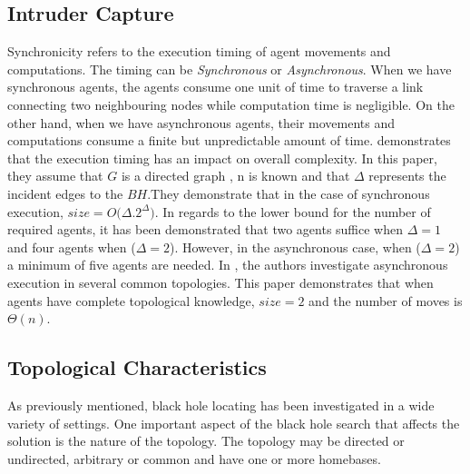 \subsection{Intruder Capture}
Synchronicity refers to the execution timing of agent movements and computations. The timing can be {\it Synchronous} or {\it Asynchronous}. When we have synchronous agents, the agents consume one unit of time to traverse a link connecting two neighbouring nodes while computation time is negligible. On the other hand, when we have asynchronous agents, their movements and computations consume a finite but unpredictable amount of time.  \cite{kosetal15} demonstrates that the execution timing has an impact on overall complexity. In this paper, they assume that $G$ is a directed graph , n is known and that $\Delta$ represents the incident edges to the $BH$.They demonstrate that in the case of synchronous execution, $size=O(\Delta$.$ 2^{\Delta})$. In regards to the lower bound for the number of required agents, it has been demonstrated that two agents suffice when $\Delta=1$ and four agents when ($\Delta=2$). However, in the asynchronous case, when ($\Delta=2$) a minimum of five agents are needed.
In \cite{dobetal3}, the authors investigate asynchronous execution in several common topologies. This paper demonstrates that when agents have complete topological knowledge, $size=2$ and the number of moves is $\Theta (n)$.

\subsection{Topological Characteristics}
As previously mentioned, black hole locating has been investigated in a wide variety of settings. One important aspect of the black hole search that affects the solution is the nature of the topology. The topology may be directed or undirected, arbitrary or common and have one or more homebases.

